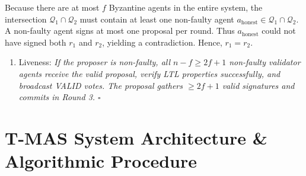 \documentclass[10pt,twocolumn,letterpaper]{article}
\begin{document}
Because there are at most $f$ Byzantine agents in the entire system, the intersection $\mathcal{Q}_1 \cap \mathcal{Q}_2$ must contain at least one non-faulty agent $a_{\text{honest}} \in \mathcal{Q}_1 \cap \mathcal{Q}_2$. A non-faulty agent signs at most one proposal per round. Thus $a_{\text{honest}}$ could not have signed both $r_1$ and $r_2$, yielding a contradiction. Hence, $r_1 = r_2$.

\begin{enumerate}
  \item Liveness:\textit{ If the proposer is non-faulty, all $n - f \ge 2f + 1$ non-faulty validator agents receive the valid proposal, verify LTL properties successfully, and broadcast VALID votes. The proposal gathers $\ge 2f + 1$ valid signatures and commits in Round 3. $\square$}
\end{enumerate}




\section{T-MAS System Architecture \& Algorithmic Procedure}
\end{document}
